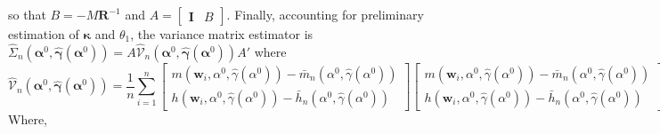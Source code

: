 \documentclass[12pt]{article}
\begin{document}
so that $B = -M \mathbf{R}^{-1}$ and $A = \left[
\begin{array}{cc}
\mathbf{I} & B
\end{array}
\right]$.
Finally, accounting for preliminary estimation of $\boldsymbol{\kappa}$ and $\theta_1$, the variance matrix estimator is $\widehat{\Sigma}_n\left(\boldsymbol{\alpha}^0, \widehat{\boldsymbol{\gamma}}(\boldsymbol{\alpha}^0)\right) = A \widehat{\mathcal{V}}_n \left(\boldsymbol{\alpha}^0, \widehat{\boldsymbol{\gamma}}(\boldsymbol{\alpha}^0)\right) A'$ where
\[
  \widehat{\mathcal{V}}_n\left(\boldsymbol{\alpha}^0, \widehat{\boldsymbol{\gamma}}(\boldsymbol{\alpha}^0)\right) = \frac{1}{n}\sum_{i=1}^n 
  \left[
  \begin{array}{c}
    m(\mathbf{w}_i, \alpha^0, \widehat{\gamma}(\alpha^0)) - \bar{m}_n(\alpha^0, \widehat{\gamma}(\alpha^0))\\
    h(\mathbf{w}_i, \alpha^0, \widehat{\gamma}(\alpha^0)) - \bar{h}_n(\alpha^0, \widehat{\gamma}(\alpha^0))
  \end{array}
\right]
  \left[
  \begin{array}{c}
    m(\mathbf{w}_i, \alpha^0, \widehat{\gamma}(\alpha^0)) - \bar{m}_n(\alpha^0, \widehat{\gamma}(\alpha^0))\\
    h(\mathbf{w}_i, \alpha^0, \widehat{\gamma}(\alpha^0)) - \bar{h}_n(\alpha^0, \widehat{\gamma}(\alpha^0))
  \end{array}
\right]'
\]
Where, 
\end{document}
